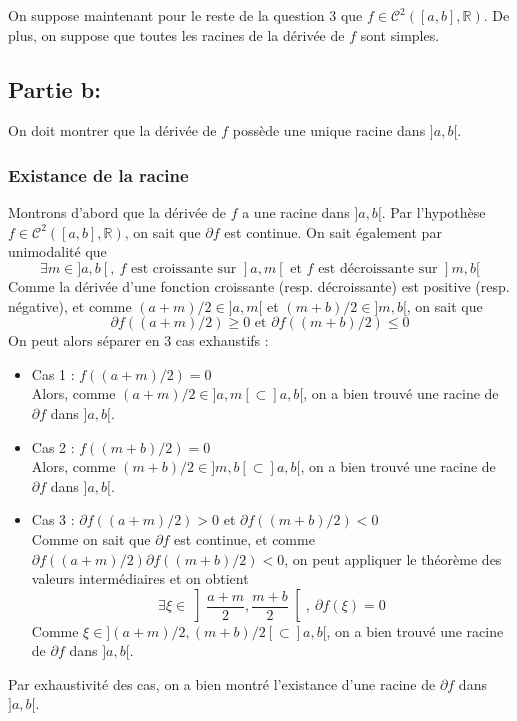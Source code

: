 \documentclass[a4paper, 12pt]{article}
\begin{document}
\newpage

On suppose maintenant pour le reste de la question 3 que \( f \in \mathcal{C}^{2}([a, b], \mathbb{R}) \). De plus, on suppose que toutes les racines de la dérivée de \( f \) sont simples.

\subsection{Partie b:}

On doit montrer que la dérivée de \( f \) possède une unique racine dans \( ]a, b[ \).

\subsubsection{Existance de la racine}

Montrons d'abord que la dérivée de \( f \) a une racine dans \( ]a, b[ \). Par l'hypothèse \( f \in \mathcal{C}^{2}([a, b], \mathbb{R}) \), on sait que \( \partial f \) est continue.
On sait également par unimodalité que
$$
\exists m \in ]a, b[,~ f \text{ est croissante sur } ]a, m[ \text{ et } f \text{ est décroissante sur } ]m, b[
$$
Comme la dérivée d'une fonction croissante (resp. décroissante) est positive (resp. négative), et comme \( (a+m)/2 \in ]a, m[ \) et \( (m+b)/2 \in ]m, b[ \), on sait que
$$
\partial f ((a+m)/2) \geq 0 \text{ et } \partial f((m+b)/2) \leq 0
$$
On peut alors séparer en 3 cas exhaustifs :
\begin{itemize}
    \item Cas 1 : \( f ((a+m)/2) = 0 \) \\
    Alors, comme \( (a+m)/2 \in ]a, m[ \subset ]a, b[ \), on a bien trouvé une racine de \( \partial f \) dans \( ]a, b[ \).
    \item Cas 2 : \( f ((m+b)/2) = 0 \) \\
    Alors, comme \( (m+b)/2 \in ]m, b[ \subset ]a, b[ \), on a bien trouvé une racine de \( \partial f \) dans \( ]a, b[ \).
    \item Cas 3 : \( \partial f ((a+m)/2) > 0 \) et \( \partial f((m+b)/2) < 0 \) \\
    Comme on sait que \( \partial f \) est continue, et comme \( \partial f ((a+m)/2) \partial f((m+b)/2) < 0 \), on peut appliquer le théorème des valeurs intermédiaires et on obtient
    $$
    \exists \xi \in \left] \frac{a+m}{2}, \frac{m+b}{2} \right[,~ \partial f (\xi) = 0
    $$
    Comme \( \xi \in ](a+m)/2, (m+b)/2[ \subset ]a, b[ \), on a bien trouvé une racine de \( \partial f \) dans \( ]a, b[ \).
\end{itemize}
Par exhaustivité des cas, on a bien montré l'existance d'une racine de \( \partial f \) dans \( ]a, b[ \).
\end{document}
